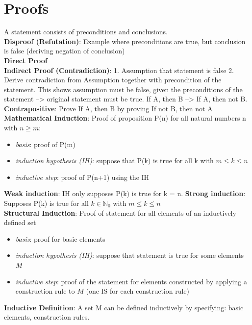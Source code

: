 \section*{Proofs}
A statement consists of preconditions and conclusions. \\
\textbf{Disproof (Refutation)}: Example where preconditions are true, but conclusion is false (deriving negation of conclusion) \\
\textbf{Direct Proof} \\
\textbf{Indirect Proof (Contradiction)}: 1. Assumption that statement is false 2. Derive contradiction from Assumption together with precondition of the statement. This shows assumption must be false, given the preconditions of the statement --> original statement must be true. If A, then B --> If A, then not B.  \\
\textbf{Contrapositive}: Prove If A, then B by proving If not B, then not A \\
\textbf{Mathematical Induction}: Proof of proposition P(n) for all natural numbers n with $n \geq m$: 
\begin{itemize}[noitemsep,topsep=0pt,leftmargin=*]
    \item \textit{basis}: proof of P(m) 
    \item \textit{induction hypothesis (IH)}: suppose that P(k) is true for all k with $m \leq k \leq n$
    \item \textit{inductive step}: proof of P(n+1) using the IH
\end{itemize}
\textbf{Weak induction}: IH only supposes P(k) is true for k = n. \textbf{Strong induction}: Supposes P(k) is true for all $k \in \mathbb{N}_0$ with $m \leq k \leq n$ \\
\textbf{Structural Induction}: Proof of statement for all elements of an inductively defined set 
\begin{itemize}[noitemsep,topsep=0pt,leftmargin=*]
    \item \textit{basis}: proof for basic elements 
    \item \textit{induction hypothesis (IH)}: suppose that statement is true for some elements $M$
    \item \textit{inductive step}: proof of the statement for elements constructed by applying a construction rule to $M$ (one IS for each construction rule) 
\end{itemize} 
\textbf{Inductive Definition}: A set M can be defined inductively by specifying: basic elements, construction rules. \\ \\

